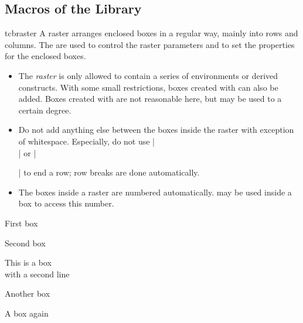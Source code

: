 
\bigskip
{\tcbuselistingtext}

\clearpage
\subsection{Macros of the Library}\label{subsec:raster_macros}

\begin{docEnvironment}[doc new and updated={2014-11-10}{2017-02-01}]{tcbraster}{}
A raster arranges enclosed boxes in a regular way, mainly into rows and
columns. The  are used to control the raster
parameters and to set the properties for the enclosed boxes.
\begin{itemize}
\item The \emph{raster} is only allowed to contain a series of
   environments or derived constructs.
  With some small restrictions, boxes created with  can also be added.
  Boxes created with  are not reasonable here, but may be
  used to a certain degree.
\item Do not add anything else between the boxes inside the raster with
  exception of white\-space. Especially, do not use |\\| or |\par| to end
  a row; row breaks are done automatically.
\item The boxes inside a raster are numbered automatically.
   may be used inside a box to access
  this number.
\end{itemize}

\begin{dispExample}
\begin{tcbraster}[raster columns=3, raster equal height,
  size=small,colframe=red!50!black,colback=red!10!white,colbacktitle=red!50!white,
  title={Box \# \thetcbrasternum}]
  \begin{tcolorbox}First box\end{tcolorbox}
  \begin{tcolorbox}Second box\end{tcolorbox}
  \begin{tcolorbox}This is a box\\with a second line\end{tcolorbox}
  \begin{tcolorbox}Another box\end{tcolorbox}
  \begin{tcolorbox}A box again\end{tcolorbox}
\end{tcbraster}
\end{dispExample}


\end{docEnvironment}
